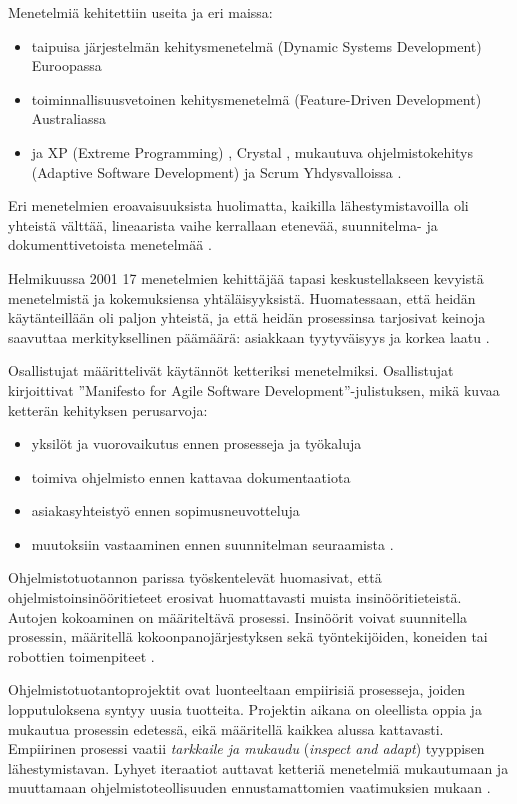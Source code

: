 \documentclass[finnish]{tktltiki2}
\theoremstyle{definition}
\theoremstyle{remark}
\begin{document}
Menetelmiä kehitettiin useita ja eri maissa: 
\begin{itemize}
 \item taipuisa järjestelmän kehitysmenetelmä (Dynamic Systems Development) Euroopassa
 \item toiminnallisuusvetoinen kehitysmenetelmä (Feature-Driven Development) Australiassa
 \item ja XP (Extreme Programming) \cite{BEC99}, Crystal \cite{COC05}, mukautuva ohjelmistokehitys (Adaptive Software Development) ja Scrum \cite{SCH09} Yhdysvalloissa \cite{WIC03}.
\end{itemize}

Eri menetelmien eroavaisuuksista huolimatta, kaikilla lähestymistavoilla oli yhteistä välttää, lineaarista vaihe kerrallaan etenevää, suunnitelma- ja dokumenttivetoista menetelmää \cite{LAB03}.

Helmikuussa 2001 17 menetelmien kehittäjää tapasi keskustellakseen kevyistä menetelmistä ja kokemuksiensa yhtäläisyyksistä. Huomatessaan, että heidän käytänteillään oli paljon yhteistä, ja että heidän prosessinsa tarjosivat keinoja saavuttaa merkityksellinen päämäärä: asiakkaan tyytyväisyys ja korkea laatu \cite{WIC03}. 

Osallistujat määrittelivät käytännöt ketteriksi menetelmiksi.
Osallistujat kirjoittivat ''Manifesto for Agile Software Development''-julistuksen, mikä kuvaa ketterän kehityksen perusarvoja:

\begin{itemize}
 \item yksilöt ja vuorovaikutus ennen prosesseja ja työkaluja
 \item toimiva ohjelmisto ennen kattavaa dokumentaatiota
 \item asiakasyhteistyö ennen sopimusneuvotteluja
 \item muutoksiin vastaaminen ennen suunnitelman seuraamista \cite{WIC03}.
\end{itemize}

Ohjelmistotuotannon parissa työskentelevät huomasivat, että ohjelmistoinsinööritieteet erosivat huomattavasti muista insinööritieteistä. Autojen kokoaminen on määriteltävä prosessi. Insinöörit voivat suunnitella prosessin, määritellä kokoonpanojärjestyksen sekä työntekijöiden, koneiden tai robottien toimenpiteet \cite{WIC03}.

Ohjelmistotuotantoprojektit ovat luonteeltaan empiirisiä prosesseja, joiden lopputuloksena syntyy uusia tuotteita. Projektin aikana on oleellista oppia ja mukautua prosessin edetessä, eikä määritellä kaikkea alussa kattavasti. Empiirinen prosessi vaatii \textit{tarkkaile ja mukaudu} (\textit{inspect and adapt}) tyyppisen lähestymistavan. Lyhyet iteraatiot auttavat ketteriä menetelmiä mukautumaan ja muuttamaan ohjelmistoteollisuuden ennustamattomien vaatimuksien mukaan \cite{WIC03}.
\end{document}
